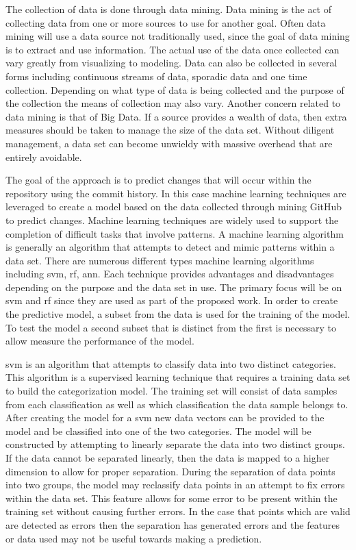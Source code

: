 The collection of data is done through data mining. Data mining is the act of collecting data from one or more sources to use for another goal. Often data mining will use a data source not traditionally used, since the goal of data mining is to extract and use information. The actual use of the data once collected can vary greatly from visualizing to modeling. Data can also be collected in several forms including continuous streams of data, sporadic data and one time collection. Depending on what type of data is being collected and the purpose of the collection the means of collection may also vary. Another concern related to data mining is that of Big Data. If a source provides a wealth of data, then extra measures should be taken to manage the size of the data set. Without diligent management, a data set can become unwieldy with massive overhead that are entirely avoidable.

The goal of the approach is to predict changes that will occur within the repository using the commit history. In this case machine learning techniques are leveraged to create a model based on the data collected through mining GitHub to predict changes. Machine learning techniques are widely used to support the completion of difficult tasks that involve patterns. A machine learning algorithm is generally an algorithm that attempts to detect and mimic patterns within a data set. There are numerous different types machine learning algorithms including \gls{svm}, \gls{rf}, \gls{ann}. Each technique provides advantages and disadvantages depending on the purpose and the data set in use. The primary focus will be on \gls{svm} and \gls{rf} since they are used as part of the proposed work. In order to create the predictive model, a subset from the data is used for the training of the model. To test the model a second subset that is distinct from the first is necessary to allow measure the performance of the model.

\gls{svm} is an algorithm that attempts to classify data into two distinct categories. This algorithm is a supervised learning technique that requires a training data set to build the categorization model. The training set will consist of data samples from each classification as well as which classification the data sample belongs to. After creating the model for a \gls{svm} new data vectors can be provided to the model and be classified into one of the two categories. The model will be constructed by attempting to linearly separate the data into two distinct groups. If the data cannot be separated linearly, then the data is mapped to a higher dimension to allow for proper separation. During the separation of data points into two groups, the model may reclassify data points in an attempt to fix errors within the data set. This feature allows for some error to be present within the training set without causing further errors. In the case that points which are valid are detected as errors then the separation has generated errors and the features or data used may not be useful towards making a prediction.%

